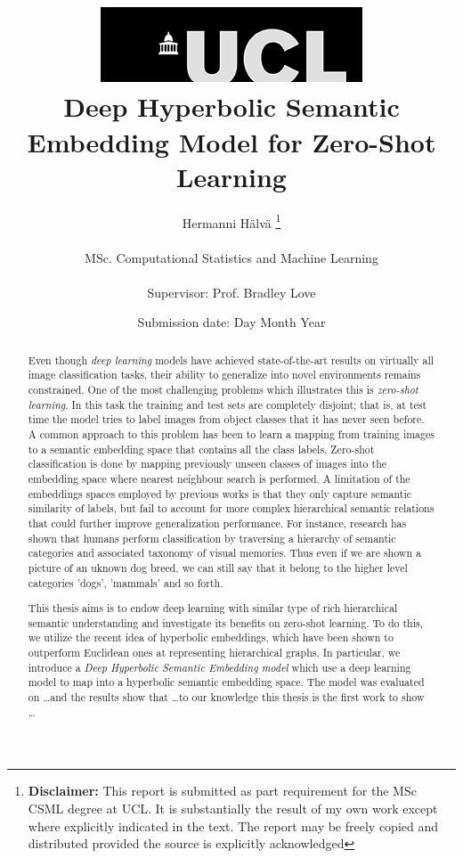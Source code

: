 \documentclass[12pt]{report}
\title{  	{ \includegraphics[scale=.5]{ucl_logo.png}}\\
{{\Huge Deep Hyperbolic Semantic Embedding Model for Zero-Shot Learning}}\\
		}
\date{Submission date: Day Month Year}
\author{Hermanni H{\"a}lv{\"a} \thanks{
{\bf Disclaimer:}
This report is submitted as part requirement for the MSc CSML degree at UCL. It is
substantially the result of my own work except where explicitly indicated in the text.
The report may be freely copied and distributed provided the source is explicitly acknowledged
\newline  %
}
\\ \\
MSc. Computational Statistics and Machine Learning\\ \\
Supervisor: Prof. Bradley Love}
\begin{document}
 
\onehalfspacing
\maketitle

\begin{abstract}
  Even though \textit{deep learning} models have achieved state-of-the-art results on virtually all image classification tasks, their ability to generalize into novel environments remains constrained. One of the most challenging problems which illustrates this is \textit{zero-shot learning}. In this task the training and test sets are completely disjoint; that is, at test time the model tries to label images from object classes that it has never seen before. A common approach to this problem has been to learn a mapping from training images to a semantic embedding space that contains all the class labels. Zero-shot classification is done by mapping previously unseen classes of images into the embedding space where nearest neighbour search is performed. A limitation of the embeddings spaces employed by previous works is that they only capture semantic similarity of labels, but fail to account for more complex hierarchical semantic relations that could further improve generalization performance. For instance, research has shown that humans perform classification by traversing a hierarchy of semantic categories and associated taxonomy of visual memories. Thus even if we are shown a picture of an uknown dog breed, we can still say that it belong to the higher level categories 'dogs', 'mammals' and so forth. 

This thesis aims is to endow deep learning with similar type of rich hierarchical semantic understanding and investigate its benefits on zero-shot learning. To do this, we utilize the recent idea of hyperbolic embeddings, which have been shown to outperform Euclidean ones at representing hierarchical graphs. In particular, we introduce a \textit{Deep Hyperbolic Semantic Embedding model} which use a deep learning model to map into a hyperbolic semantic embedding space. The model was evaluated on  \dots and the results show that \dots to our knowledge this thesis is the first work to show \dots

\end{abstract}
\end{document}
